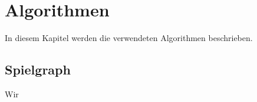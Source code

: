 \section{Algorithmen}
In diesem Kapitel werden die verwendeten Algorithmen beschrieben.
\subsection{Spielgraph}
Wir%